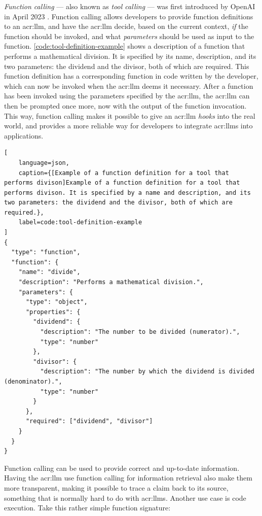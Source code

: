 \textit{Function calling} --- also known as \textit{tool calling} --- was first introduced by OpenAI in April 2023 \citep{eletiFunctionCallingOther2023}. Function calling allows developers to provide function definitions to an \gls{acr:llm}, and have the \gls{acr:llm} decide, based on the current context, \textit{if} the function should be invoked, and what \textit{parameters} should be used as input to the function. \autoref{code:tool-definition-example} shows a description of a function that performs a mathematical division. It is specified by its name, description, and its two parameters: the dividend and the divisor, both of which are required. This function definition has a corresponding function in code written by the developer, which can now be invoked when the \acrshort{acr:llm} deems it necessary. After a function has been invoked using the parameters specified by the \acrshort{acr:llm}, the \acrshort{acr:llm} can then be prompted once more, now with the output of the function invocation. This way, function calling makes it possible to give an \gls{acr:llm} \textit{hooks} into the real world, and provides a more reliable way for developers to integrate \glspl{acr:llm} into applications.

\begin{lstlisting}[
    language=json,
    caption={[Example of a function definition for a tool that performs divison]Example of a function definition for a tool that performs divison. It is specified by a name and description, and its two parameters: the dividend and the divisor, both of which are required.},
    label=code:tool-definition-example
]
{
  "type": "function",
  "function": {
    "name": "divide",
    "description": "Performs a mathematical division.",
    "parameters": {
      "type": "object",
      "properties": {
        "dividend": {
          "description": "The number to be divided (numerator).",
          "type": "number"
        },
        "divisor": {
          "description": "The number by which the dividend is divided (denominator).",
          "type": "number"
        }
      },
      "required": ["dividend", "divisor"]
    }
  }
}
\end{lstlisting}

Function calling can be used to provide correct and up-to-date information. Having the \gls{acr:llm} use function calling for information retrieval also make them more transparent, making it possible to trace a claim back to its source, something that is normally hard to do with \glspl{acr:llm}. Another use case is code execution. Take this rather simple function signature:

